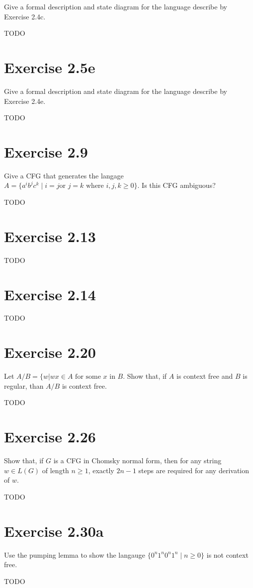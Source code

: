 \documentclass{article}
\newcommand{\where}{\mid}
\begin{document}
Give a formal description and state diagram for the language describe by
Exercise 2.4c.

TODO

\section{Exercise 2.5e}

Give a formal description and state diagram for the language describe by
Exercise 2.4e.

TODO

\section{Exercise 2.9}

Give a CFG that generates the langage $A = \{ a^i b^j c^k \where i = j \text{
or } j = k \text{ where } i, j, k \geq 0 \}$. Is this CFG ambiguous?

TODO

\section{Exercise 2.13}

TODO

\section{Exercise 2.14}

TODO

\section{Exercise 2.20}

Let $A/B = \{ w | wx \in A \text{ for some } x \text{ in } B$. Show that, if $A$
is context free and $B$ is regular, than $A/B$ is context free.

TODO

\section{Exercise 2.26}

Show that, if $G$ is a CFG in Chomsky normal form, then for any string $w \in
L(G)$ of length $n \geq 1$, exactly $2n - 1$ steps are required for any
derivation of $w$.

TODO

\section{Exercise 2.30a}

Use the pumping lemma to show the langauge $\{ 0^n 1^n 0^n 1^n \where n \geq 0
\}$ is not context free.

TODO
\end{document}
